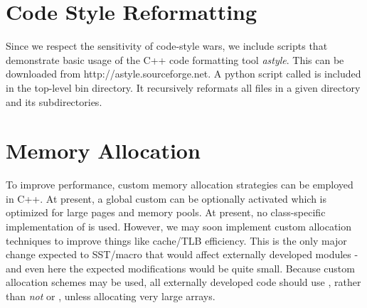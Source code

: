 \section{Code Style Reformatting}
Since we respect the sensitivity of code-style wars, we include scripts that demonstrate basic usage of the C++ code formatting tool \emph{astyle}.
This can be downloaded from {http://astyle.sourceforge.net}. 
A python script called  is included in the top-level bin directory.
It recursively reformats all files in a given directory and its subdirectories.

\section{Memory Allocation}
To improve performance, custom memory allocation strategies can be employed in C++.
At present, a global custom  can be optionally activated which is optimized for large pages and memory pools.
At present, no class-specific implementation of  is used.
However, we may soon implement custom allocation techniques to improve things like cache/TLB efficiency.
This is the only major change expected to SST/macro that would affect externally developed modules - 
and even here the expected modifications would be quite small.
Because custom allocation schemes may be used, all externally developed code should use , rather than \emph{not}   or , unless allocating very large arrays.

